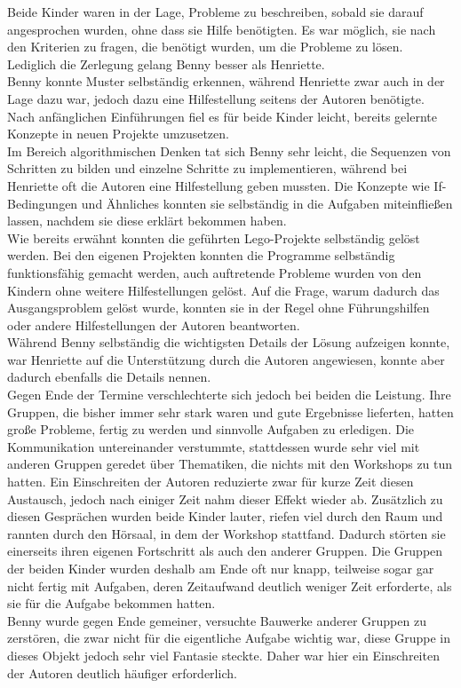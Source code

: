 Beide Kinder waren in der Lage, Probleme zu beschreiben, sobald sie darauf angesprochen wurden, ohne dass sie Hilfe benötigten. Es war möglich, sie nach den Kriterien zu fragen, die benötigt wurden, um die Probleme zu lösen. Lediglich die Zerlegung gelang Benny besser als Henriette.\\
Benny konnte Muster selbständig erkennen, während Henriette zwar auch in der Lage dazu war, jedoch dazu eine Hilfestellung seitens der Autoren benötigte. Nach anfänglichen Einführungen fiel es für beide Kinder leicht, bereits gelernte Konzepte in neuen Projekte umzusetzen.\\
Im Bereich algorithmischen Denken tat sich Benny sehr leicht, die Sequenzen von Schritten zu bilden und einzelne Schritte zu implementieren, während bei Henriette oft die Autoren eine Hilfestellung geben mussten. Die Konzepte wie If-Bedingungen und Ähnliches konnten sie selbständig in die Aufgaben miteinfließen lassen, nachdem sie diese erklärt bekommen haben.\\
Wie bereits erwähnt konnten die geführten Lego-Projekte selbständig gelöst werden. Bei den eigenen Projekten konnten die Programme selbständig funktionsfähig gemacht werden, auch auftretende Probleme wurden von den Kindern ohne weitere Hilfestellungen gelöst. Auf die Frage, warum dadurch das Ausgangsproblem gelöst wurde, konnten sie in der Regel ohne Führungshilfen oder andere Hilfestellungen der Autoren beantworten.\\
Während Benny selbständig die wichtigsten Details der Lösung aufzeigen konnte, war Henriette auf die Unterstützung durch die Autoren angewiesen, konnte aber dadurch ebenfalls die Details nennen.\\

Gegen Ende der Termine verschlechterte sich jedoch bei beiden die Leistung. Ihre Gruppen, die bisher immer sehr stark waren und gute Ergebnisse lieferten, hatten große Probleme, fertig zu werden und sinnvolle Aufgaben zu erledigen. Die Kommunikation untereinander verstummte, stattdessen wurde sehr viel mit anderen Gruppen geredet über Thematiken, die nichts mit den Workshops zu tun hatten. Ein Einschreiten der Autoren reduzierte zwar für kurze Zeit diesen Austausch, jedoch nach einiger Zeit nahm dieser Effekt wieder ab. Zusätzlich zu diesen Gesprächen wurden beide Kinder lauter, riefen viel durch den Raum und rannten durch den Hörsaal, in dem der Workshop stattfand. Dadurch störten sie einerseits ihren eigenen Fortschritt als auch den anderer Gruppen. Die Gruppen der beiden Kinder wurden deshalb am Ende oft nur knapp, teilweise sogar gar nicht fertig mit Aufgaben, deren Zeitaufwand deutlich weniger Zeit erforderte, als sie für die Aufgabe bekommen hatten.\\
Benny wurde gegen Ende gemeiner, versuchte Bauwerke anderer Gruppen zu zerstören, die zwar nicht für die eigentliche Aufgabe wichtig war, diese Gruppe in dieses Objekt jedoch sehr viel Fantasie steckte. Daher war hier ein Einschreiten der Autoren deutlich häufiger erforderlich.


